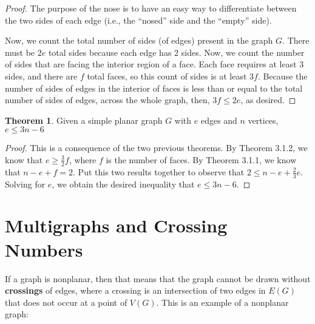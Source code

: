 \documentclass{scrippsthesisclass}
\theoremstyle{definition}
\newtheorem{theorem}{Theorem}[section]
\begin{document}
\begin{proof}
    The purpose of the nose is to have an easy way to differentiate between the two sides of each edge (i.e., the ``nosed'' side and the ``empty'' side). 
    
    Now, we count the total number of sides (of edges) present in the graph $G$. 
    There must be $2e$ total sides because each edge has $2$ sides. 
    Now, we count the number of sides that are facing the interior region of a face. 
    Each face requires at least $3$ sides, and there are $f$ total faces, so this count of sides is at least $3f$. 
    Because the number of sides of edges in the interior of faces is less than or equal to the total number of sides of edges, across the whole graph, then, $3f \leq 2e$, as desired.
\end{proof}

\begin{theorem}
    Given a simple planar graph $G$ with $e$ edges and $n$ vertices, $e \leq 3n - 6$
\end{theorem}
\begin{proof}
    This is a consequence of the two previous theorems. 
    By Theorem 3.1.2, we know that $e \geq \frac{3}{2}f$, where $f$ is the number of faces. 
    By Theorem 3.1.1, we know that $n - e + f = 2$.
    Put this two results together to observe that $2 \leq n - e + \frac{2}{3}e$. 
    Solving for $e$, we obtain the desired inequality that $e \leq 3n - 6$. 
\end{proof}

\section{Multigraphs and Crossing Numbers}
If a graph is nonplanar, then that means that the graph cannot be drawn without \textbf{crossings} of edges, where a crossing is an intersection of two edges in $E(G)$ that does not occur at a point of $V(G)$.
This is an example of a nonplanar graph: 
\begin{center}
\end{center}
\end{document}
